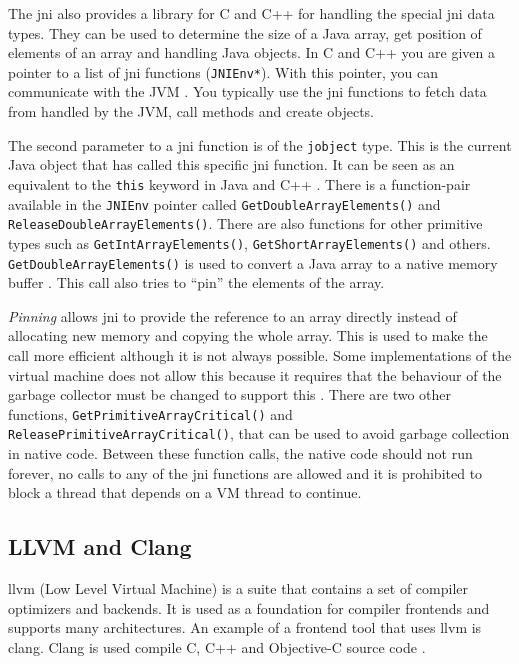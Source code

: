 The \gls{jni} also provides a library for C and C++ for handling the special \gls{jni} data types. They can be used to determine the size of a Java array, get position of elements of an array and handling Java objects. In C and C++ you are given a pointer to a list of \gls{jni} functions (\texttt{JNIEnv*}). With this pointer, you can communicate with the JVM \cite[p.~22]{liang1999java}. You typically use the \gls{jni} functions to fetch data from handled by the JVM, call methods and create objects.

The second parameter to a \gls{jni} function is of the \texttt{jobject} type. This is the current Java object that has called this specific \gls{jni} function. It can be seen as an equivalent to the \texttt{this} keyword in Java and C++ \cite[p.~23]{liang1999java}. There is a function-pair available in the \texttt{JNIEnv} pointer called \texttt{GetDoubleArrayElements()} and \texttt{ReleaseDoubleArrayElements()}. There are also functions for other primitive types such as \texttt{GetIntArrayElements()}, \texttt{GetShortArrayElements()} and others. \texttt{GetDoubleArrayElements()} is used to convert a Java array to a native memory buffer \cite[p.~159]{liang1999java}. This call also tries to \enquote{pin} the elements of the array.

\emph{Pinning} allows \gls{jni} to provide the reference to an array directly instead of allocating new memory and copying the whole array. This is used to make the call more efficient although it is not always possible. Some implementations of the virtual machine does not allow this because it requires that the behaviour of the garbage collector must be changed to support this \cite[p.~158]{liang1999java}. There are two other functions, \texttt{GetPrimitiveArrayCritical()} and \texttt{ReleasePrimitiveArrayCritical()}, that can be used to avoid garbage collection in native code. Between these function calls, the native code should not run forever, no calls to any of the \gls{jni} functions are allowed and it is prohibited to block a thread that depends on a VM thread to continue.


\subsection{LLVM and Clang}
\gls{llvm} (Low Level Virtual Machine) is a suite that contains a set of compiler optimizers and backends. It is used as a foundation for compiler frontends and supports many architectures. An example of a frontend tool that uses \gls{llvm} is \gls{clang}. Clang is used compile C, C++ and Objective-C source code \cite{clang:comp}.

